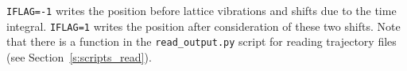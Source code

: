 \texttt{IFLAG=-1} writes the position before lattice vibrations and shifts due
to the time integral. \texttt{IFLAG=1} writes the position after consideration
of these two shifts. Note that there is a function in the
\texttt{read\_output.py} script for reading trajectory files (see
Section~\ref{s:scripts_read}).
